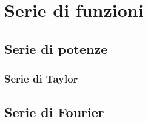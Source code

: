 \chapter{Serie di funzioni}
\section{Serie di potenze}
\subsection{Serie di Taylor}

\section{Serie di Fourier}\label{ch:fourier-series}

